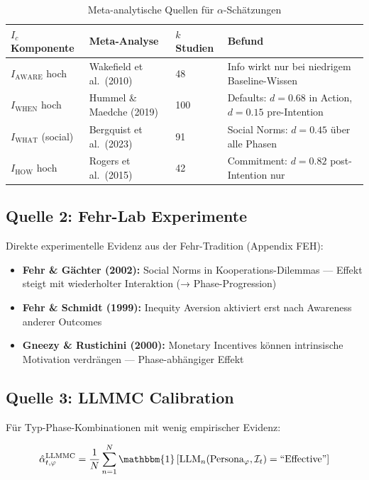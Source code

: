 \begin{table}[htbp]
\centering
\caption{Meta-analytische Quellen für $\alpha$-Schätzungen}
\label{tab:18-meta-sources}
\renewcommand{\arraystretch}{1.3}
\small
\begin{tabular}{@{}llll@{}}
\toprule
\textbf{$I_c$ Komponente} & \textbf{Meta-Analyse} & \textbf{$k$ Studien} & \textbf{Befund} \\
\midrule
$I_{\text{AWARE}}$ hoch & Wakefield et al.\ (2010) & 48 & Info wirkt nur bei niedrigem Baseline-Wissen \\
$I_{\text{WHEN}}$ hoch & Hummel \& Maedche (2019) & 100 & Defaults: $d = 0.68$ in Action, $d = 0.15$ pre-Intention \\
$I_{\text{WHAT}}$ (social) & Bergquist et al.\ (2023) & 91 & Social Norms: $d = 0.45$ \"{u}ber alle Phasen \\
$I_{\text{HOW}}$ hoch & Rogers et al.\ (2015) & 42 & Commitment: $d = 0.82$ post-Intention nur \\
\bottomrule
\end{tabular}
\end{table}

\subsection{Quelle 2: Fehr-Lab Experimente}

Direkte experimentelle Evidenz aus der Fehr-Tradition (Appendix FEH):

\begin{itemize}
\item \textbf{Fehr \& Gächter (2002):} Social Norms in Kooperations-Dilemmas --- Effekt steigt mit wiederholter Interaktion (→ Phase-Progression)
\item \textbf{Fehr \& Schmidt (1999):} Inequity Aversion aktiviert erst nach Awareness anderer Outcomes
\item \textbf{Gneezy \& Rustichini (2000):} Monetary Incentives können intrinsische Motivation verdrängen --- Phase-abhängiger Effekt
\end{itemize}

\subsection{Quelle 3: LLMMC Calibration}

Für Typ-Phase-Kombinationen mit wenig empirischer Evidenz:

\begin{equation}
\hat{\alpha}_{t,\varphi}^{\text{LLMMC}} = \frac{1}{N} \sum_{n=1}^{N} \mathbbm{1}\left[ \text{LLM}_n(\text{Persona}_\varphi, \mathcal{I}_t) = \text{``Effective''} \right]
\label{eq:18-llmmc-alpha}
\end{equation}

